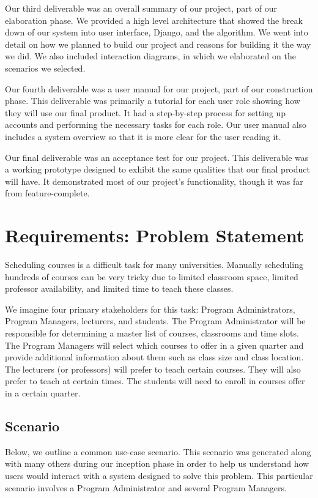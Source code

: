 \documentclass[12pt]{article}
\begin{document}
Our third deliverable was an overall summary of our project, part of our elaboration phase. We provided a high level architecture that showed the break down of our system into user interface, Django, and the algorithm. We went into detail on how we planned to build our project and reasons for building it the way we did. We also included interaction diagrams, in which we elaborated on the scenarios we selected. 

Our fourth deliverable was a user manual for our project, part of our construction phase. This deliverable was primarily a tutorial for each user role showing how they will use our final product. It had a step-by-step process for setting up accounts and performing the necessary tasks for each role. Our user manual also includes a system overview so that it is more clear for the user reading it.

Our final deliverable was an acceptance test for our project. This deliverable was a working prototype designed to exhibit the same qualities that our final product will have. It demonstrated most of  our project's functionality, though it was far from feature-complete.

\section{Requirements: Problem Statement} %
Scheduling courses is a difficult task for many universities. Manually scheduling hundreds of courses can be very tricky due to limited classroom space, limited professor availability, and limited time to teach these classes. 

We imagine four primary stakeholders for this task: Program Administrators, Program Managers, lecturers, and students. The Program Administrator will be responsible for determining a master list of courses, classrooms and time slots. The Program Managers will select which courses to offer in a given quarter and provide additional information about them such as class size and class location. The lecturers (or professors) will prefer to teach certain courses. They will also prefer to teach at certain times. The students will need to enroll in courses offer in a certain quarter.

\subsection{Scenario}

Below, we outline a common use-case scenario. This scenario was generated along with many others during our inception phase in order to help us understand how users would interact with a system designed to solve this problem. This particular scenario involves a Program Administrator and several Program Managers.
\end{document}
